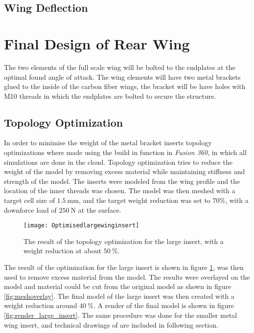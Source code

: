   \subsection{Wing Deflection}

\section{Final Design of Rear Wing}

  The two elements of the full scale wing will be bolted to the endplates at the optimal found angle of attack. The wing elements will have two metal brackets glued to the inside of the carbon fiber wings, the bracket will be have holes with M10 threads in which the endplates are bolted to secure the structure.

  \subsection{Topology Optimization}

  In order to minimise the weight of the metal bracket inserts topology optimizations where made using the build in function in \emph{Fusion 360}, in which all simulations are done in the cloud. Topology optimization tries to reduce the weight of the model by removing excess material while maintaining stiffness and strength of the model.
  The inserts were modeled from the wing profile and the location of the inner threads was chosen. The model was then meshed with a target cell size of $\SI{1.5}{\milli\metre}$, and the target weight reduction was set to $70\%$, with a downforce load of $\SI{250}{\newton}$ at the surface.

  \begin{figure}
    \texttt{[image: Optimisedlargewinginsert]}
    \caption{The result of the topology optimization for the large insert, with a weight reduction at about $\SI{50}{\%}$.}
    \label{fig:topology_large_insert}
  \end{figure}

  The result of the optimization for the large insert is shown in figure \ref{fig:topology_large_insert}, was then used to remove excess material from the model. The results were overlayed on the model and material could be cut from the original model as shown in figure
  \ref{fig:meshoverlay}. The final model of the large insert was then created with a weight reduction around $\SI{40}{\%}$. A render of the final model is shown in
  figure \ref{fig:render_large_insert}. The same procedure was done for the smaller metal wing insert, and technical drawings of are included in following section.


